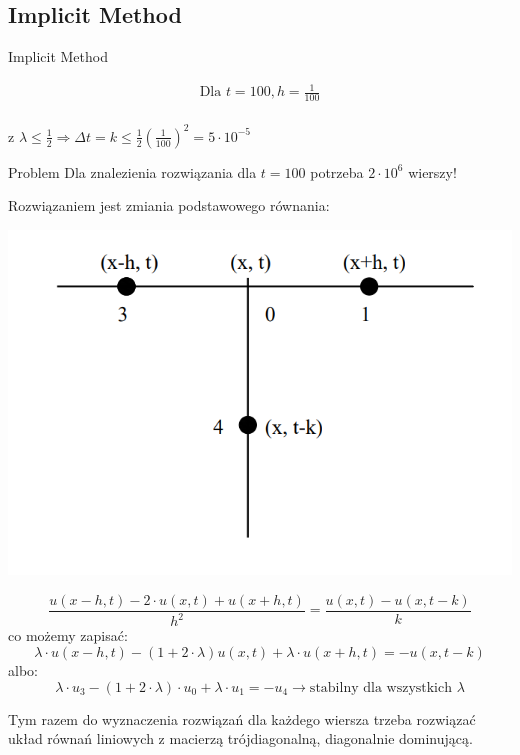
\subsection{Implicit Method}
\begin{frame}{Implicit Method}

\begin{block}{}
   $$ \begin{array}{l}
   \text{Dla } t = 100, h = \frac{1}{100} \\
   \end{array}$$
 \end{block}
 
z $\lambda \leq \frac{1}{2} \Rightarrow \Delta t = k \leq \frac{1}{2}(\frac{1}{100})^2 = 5 \cdot 10^{-5}$  \\
  \begin{alertblock}{Problem}
    Dla znalezienia rozwiązania dla $t = 100$ potrzeba $2 \cdot 10^6$ wierszy!
  \end{alertblock}
Rozwiązaniem jest zmiania podstawowego równania: 
       \centerline{\includegraphics[width = 0.5 \linewidth]{img/23/implicit}}
\end{frame}

\begin{frame}
\begin{equation}\frac{u(x-h,t) - 2 \cdot u(x,t) + u(x+h, t)}{h^2} = \frac{u(x,t) - u(x,t - k)}{k}\end{equation}
co możemy zapisać: \begin{equation}\lambda \cdot u(x-h,t) - (1+2 \cdot \lambda)u(x,t) + \lambda \cdot u(x+h,t) = -u(x,t-k)\end{equation} 
albo:\begin{equation}\lambda \cdot u_3 - (1+2\cdot \lambda) \cdot u_0 + \lambda \cdot u_1 = - u_4 \rightarrow \text{stabilny dla wszystkich } \lambda\end{equation}

\begin{block}{}
Tym razem do wyznaczenia rozwiązań dla każdego wiersza trzeba
rozwiązać układ równań liniowych z macierzą trójdiagonalną, diagonalnie dominującą.
\end{block}

\end{frame}